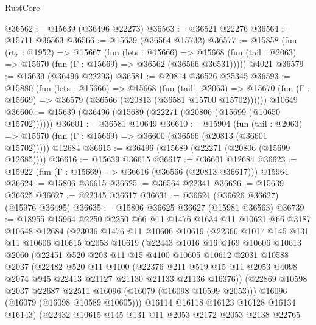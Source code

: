 \begin{lexlean}{RustCore}
\begin{coremodule}
@36562 := @15639 (@36496 @22273)
@36563 := @36521 @22276
@36564 := @15711 @36563
@36566 := @15639 (@36564 @15732)
@36577 := @15858
    (fun (rty : @1952) =>
    @15667
      (fun (lets : @15666) =>
      @15668 (fun (tail : @2063) => @15670 (fun (Γ : @15669) => @36562 (@36566 @36531)))))
    @4021
@36579 := @15639 (@36496 @22293)
@36581 := @20814 @36526 @25345
@36593 := @15880
    (fun (lets : @15666) =>
    @15668
      (fun (tail : @2063) =>
      @15670 (fun (Γ : @15669) => @36579 (@36566 (@20813 (@36581 @15700 @15702))))))
    @10649
@36600 := @15639 (@36496 (@15689 (@22271 (@20806 (@15699 (@10650 @15702))))))
@36601 := @36581 @10649
@36610 := @15904
    (fun (tail : @2063) => @15670 (fun (Γ : @15669) => @36600 (@36566 (@20813 (@36601 @15702)))))
    @12684
@36615 := @36496 (@15689 (@22271 (@20806 (@15699 @12685))))
@36616 := @15639 @36615
@36617 := @36601 @12684
@36623 := @15922 (fun (Γ : @15669) => @36616 (@36566 (@20813 @36617))) @15964
@36624 := @15806 @36615
@36625 := @36564 @22341
@36626 := @15639 @36625
@36627 := @22345 @36617
@36631 := @36624 (@36626 @36627) (@15976 @36495)
@36635 := @15806 @36625 @36627 (@15981 @36563)
@36739 := @18955
    @15964
    @2250
    @2250
    @66
    @11
    @1476
    @1634
    @11
    @10621
    @66
    @3187
    @10648
    @12684
    (@23036
      @1476
      @11
      @10606
      @10619
      (@22366
        @1017
        @145
        @131
        @11
        @10606
        @10615
        @2053
        @10619
        (@22443
          @1016
          @16
          @169
          @10606
          @10613
          @2060
          (@22451
            @520
            @203
            @11
            @15
            @4100
            @10605
            @10612
            @2031
            @10588
            @2037
            (@22482
              @520
              @11
              @4100
              (@22376
                @211
                @519
                @15
                @11
                @2053
                @4098
                @2074
                @945
                @22413
                @21127
                @21130
                @21133
                @21136
                @16376))
            (@22869 @10598 @2037 @22687 @22511 @16096 (@16079 (@16098 @10599 @2053)))
            @16096
            (@16079 (@16098 @10589 @10605)))
          @16114
          @16118
          @16123
          @16128
          @16134
          @16143)
        (@22432
          @10615
          @145
          @131
          @11
          @2053
          @2172
          @2053
          @2138
          @22765

\end{coremodule}
\end{lexlean}
